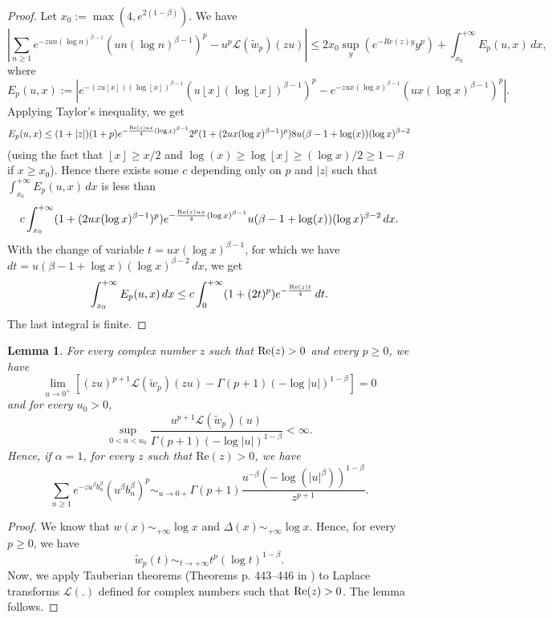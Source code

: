 \documentclass[oneside, a4paper,11pt,reqno]{amsart}
\newtheorem{lem}[hypo]{Lemma}
\begin{document}
\begin{proof}
Let $x_0:=\max(4,e^{2(1-\beta)})$.
We have
$$\left|\sum_{n\ge 1}e^{-zun(\log n)^{\beta-1}}(un(\log n)^{\beta-1})^p-
    u^p{\mathcal L}(\tilde w_p)(zu)\right|
   \le 2x_0\sup_y(e^{-Re(z)y}y^p)+\int_{x_0}^{+\infty}E_p(u,x)\, dx, $$
where $$E_p(u,x):=\left| e^{-(zu{\left\lfloor {{x}} \right\rfloor})(\log {\left\lfloor {{x}} \right\rfloor})^{\beta-1}}
      (u{\left\lfloor {{x}} \right\rfloor}(\log {\left\lfloor {{x}} \right\rfloor})^{\beta-1})^p
      -e^{-zux (\log x)^{\beta-1}} (ux(\log x)^{\beta-1})^p
    \right|.$$
Applying Taylor's inequality, 
we get
$$E_p(u,x) \le (1+|z|)(1+p)e^{-\frac{\text{\rm Re}(z) ux}4(\log x)^{\beta-1}}
  2^p(1+(2ux(\log x)^{\beta-1})^{p}) 8u
   (\beta-1 +\log(x))(\log x)^{\beta-2}$$
(using the fact that ${\left\lfloor {{x}} \right\rfloor}\ge x/2$ and $\log(x)\ge\log {\left\lfloor {{x}} \right\rfloor}\ge 
(\log x)/2\ge 1-\beta$ if $x\ge x_0$).
Hence there exists some $c$ depending only on $p$ and $|z|$
such that $\int_{x_0}^{+\infty} E_p(u,x)\, dx$ is less than
$$  c \int_{x_0}^{+\infty} (1+(2ux(\log x)^{\beta-1})^{p})e^{-\frac{\text{\rm Re}(z)ux}4(\log x)^{\beta-1}} u
   (\beta-1+\log(x))(\log x)^{\beta-2}\, dx.$$
With the change of variable 
$t=ux(\log x)^{\beta-1}$, for which we have $dt=u(\beta-1 +\log x)(\log x)^{\beta-2}\, dx$,
we get
$$ \int_{x_0}^{+\infty} E_p(u,x)\, dx
\le  c \int_{0}^{+\infty} (1+(2t)^{p})e^{-\frac{\text{\rm Re}(z) t}4}\, dt.$$
The last integral is finite.
\end{proof}
\begin{lem}\label{controlL}
For every complex number $z$ such that
$\text{\rm Re}(z)>0$ and every $p\ge 0$,  we have
$$\lim_{u\rightarrow 0^{+}} [ (z u)^{p+1}  {\mathcal L}(\tilde w_p)(z u)- \Gamma(p+1) (-\log |u|)^{1-\beta} ]= 0$$
  and for every $u_0>0$,
  $$ \sup_{0<u<u_0} \frac{u^{p+1}{\mathcal L}(\tilde w_p)(u)}{
    \Gamma(p+1) (- \log |u|)^{1-\beta} }<\infty.$$
Hence, if $\alpha=1$, for every $z$ such that $\textrm{Re}(z)>0$, we have
$$\sum_{n\ge 1}e^{-zu^\beta b_n^\beta}\left(u^\beta b_n^\beta\right)^p\sim_{u\rightarrow 0+}
     \Gamma(p+1)\frac{u^{-\beta}(-\log(|u|^\beta))^{1-\beta}}{z^{p+1}}. $$
\end{lem}
\begin{proof}
We know that $w(x)\sim_{+\infty}\log x$ and $\Delta(x)\sim_{+\infty} \log x$. 
Hence, for every $p\geq 0$, we have 
$$\tilde w_p(t)\sim_{t \rightarrow +\infty} t^p (\log t)^{1-\beta}.$$ 
Now, we apply Tauberian theorems
(Theorems p. 443--446 in \cite{Fel}) to  Laplace transforms ${\mathcal L} (.)$ defined for complex numbers such that 
$\text{\rm Re}(z)>0$.  The lemma follows.
\end{proof}
\end{document}
